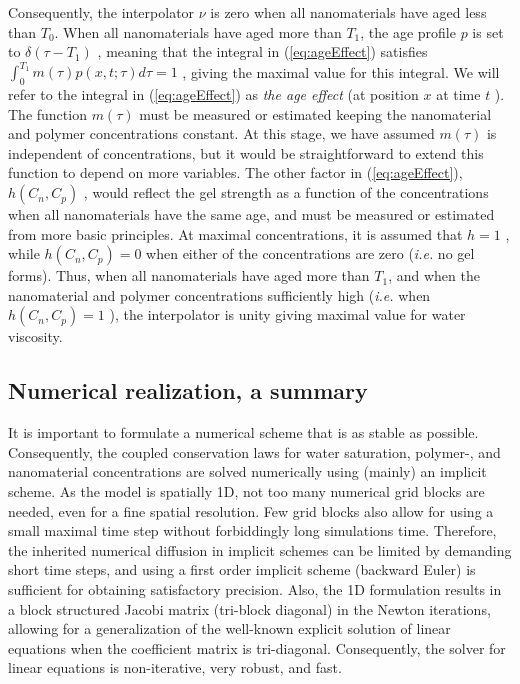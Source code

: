 \documentclass[nanomaterials,article,submit,moreauthors,pdftex]{Definitions/mdpi}
\begin{document}
Consequently, the interpolator  $\nu$ is zero when all nanomaterials have aged less than  $T_0$. When all nanomaterials have aged more than  $T_1$, the age profile $p$ is set to  $\delta(\tau-T_1)$ , meaning that the integral in (\ref{eq:ageEffect}) satisfies $\int^{T_1}_{0}m(\tau)p(x,t;\tau)d\tau=1$ , giving the maximal value for this integral. We will refer to the integral in (\ref{eq:ageEffect})  as \textit{the age effect} (at position $x$ at time $t$ ). The function $m(\tau)$ must be measured or estimated keeping the nanomaterial and polymer concentrations constant. At this stage, we have assumed  $m(\tau)$ is independent of concentrations, but it would be straightforward to extend this function to depend on more variables. The other factor in (\ref{eq:ageEffect}), $h(C_n,C_p)$ , would reflect the gel strength as a function of the concentrations when all nanomaterials have the same age, and must be measured or estimated from more basic principles. At maximal concentrations, it is assumed that $h=1$ , while $h(C_n,C_p)=0$ when either of the concentrations are zero (\textit{i.e.} no gel forms). Thus, when all nanomaterials have aged more than $T_1$, and when the nanomaterial and polymer concentrations sufficiently high (\textit{i.e.} when $h(C_n,C_p)=1$ ), the interpolator is unity giving maximal value for water viscosity.

\subsection{Numerical realization, a summary}
It is important to formulate a numerical scheme that is as stable as possible. Consequently, the coupled conservation laws for water saturation, polymer-, and nanomaterial concentrations are solved numerically using (mainly) an implicit scheme. As the model is spatially 1D, not too many numerical grid blocks are needed, even for a fine spatial resolution. Few grid blocks also allow for using a small maximal time step without forbiddingly long simulations time. Therefore, the inherited numerical diffusion in implicit schemes can be limited by demanding short time steps, and using a first order implicit scheme (backward Euler) is sufficient for obtaining satisfactory precision. Also, the 1D formulation results in a block structured Jacobi matrix (tri-block diagonal) in the Newton iterations, allowing for a generalization of the well-known explicit solution of linear equations when the coefficient matrix is tri-diagonal. Consequently, the solver for linear equations is non-iterative, very robust, and fast. 
\end{document}
